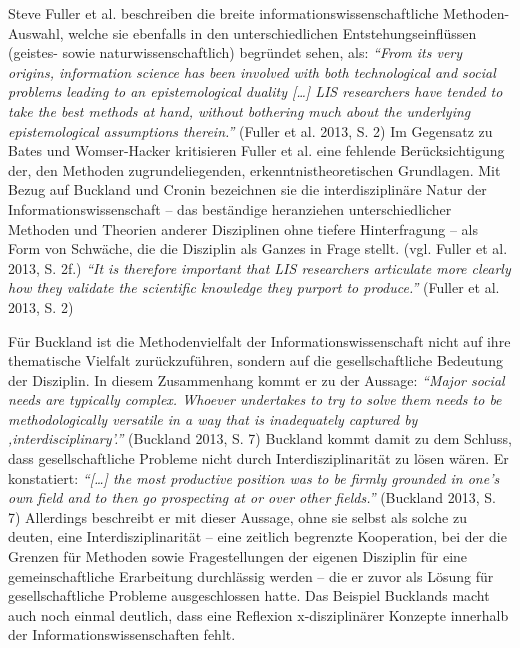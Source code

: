 \documentclass[a4paper,
fontsize=11pt,
oneside,
numbers=noperiodatend,
parskip=half-,
bibliography=totoc,
final
]{scrartcl}
\begin{document}
Steve Fuller et al. beschreiben die breite informationswissenschaftliche
Methoden-Auswahl, welche sie ebenfalls in den unterschiedlichen
Entstehungseinflüssen (geistes- sowie naturwissenschaftlich) begründet
sehen, als: \emph{\enquote{From its very origins, information science
has been involved with both technological and social problems leading to
an epistemological duality {[}\ldots{}{]} LIS researchers have tended to
take the best methods at hand, without bothering much about the
underlying epistemological assumptions therein.}} (Fuller et al. 2013,
S. 2) Im Gegensatz zu Bates und Womser-Hacker kritisieren Fuller et al.
eine fehlende Berücksichtigung der, den Methoden zugrundeliegenden,
erkenntnistheoretischen Grundlagen. Mit Bezug auf Buckland und Cronin
bezeichnen sie die interdisziplinäre Natur der Informationswissenschaft
-- das beständige heranziehen unterschiedlicher Methoden und Theorien
anderer Disziplinen ohne tiefere Hinterfragung -- als Form von Schwäche,
die die Disziplin als Ganzes in Frage stellt. (vgl. Fuller et al. 2013,
S. 2f.) \emph{\enquote{It is therefore important that LIS researchers
articulate more clearly how they validate the scientific knowledge they
purport to produce.}} (Fuller et al. 2013, S. 2)

Für Buckland ist die Methodenvielfalt der Informationswissenschaft nicht
auf ihre thematische Vielfalt zurückzuführen, sondern auf die
gesellschaftliche Bedeutung der Disziplin. In diesem Zusammenhang kommt
er zu der Aussage: \emph{\enquote{Major social needs are typically
complex. Whoever undertakes to try to solve them needs to be
methodologically versatile in a way that is inadequately captured by
‚interdisciplinary'.}} (Buckland 2013, S. 7) Buckland kommt damit zu dem
Schluss, dass gesellschaftliche Probleme nicht durch
Interdisziplinarität zu lösen wären. Er konstatiert:
\emph{\enquote{{[}\ldots{}{]} the most productive position was to be
firmly grounded in one's own field and to then go prospecting at or over
other fields.}} (Buckland 2013, S. 7) Allerdings beschreibt er mit
dieser Aussage, ohne sie selbst als solche zu deuten, eine
Interdisziplinarität -- eine zeitlich begrenzte Kooperation, bei der die
Grenzen für Methoden sowie Fragestellungen der eigenen Disziplin für
eine gemeinschaftliche Erarbeitung durchlässig werden -- die er zuvor
als Lösung für gesellschaftliche Probleme ausgeschlossen hatte. Das
Beispiel Bucklands macht auch noch einmal deutlich, dass eine Reflexion
x-disziplinärer Konzepte innerhalb der Informationswissenschaften fehlt.
\end{document}
